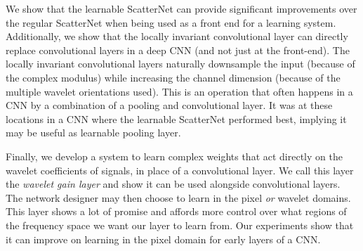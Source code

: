 \documentclass{article}
\begin{document}
  We show that the learnable ScatterNet can provide significant improvements
  over the regular ScatterNet when being used as a front end for a learning
  system. Additionally, we show that the locally invariant convolutional
  layer can directly replace convolutional layers in a deep CNN (and not just at the front-end).
  The locally invariant convolutional layers naturally downsample the input
  (because of the complex modulus) while increasing the channel dimension (because of the multiple
  wavelet orientations used). This is an operation that often happens in a CNN
  by a combination of a pooling and convolutional layer. It was at these
  locations in a CNN where the learnable ScatterNet performed best, implying it
  may be useful as learnable pooling layer.

  Finally, we develop a system to learn complex weights that act directly on the
  wavelet coefficients of signals, in place of a convolutional layer. We call
  this layer the \emph{wavelet gain layer} and show it can be used alongside convolutional
  layers. The network designer may then choose to learn in the pixel \emph{or}
  wavelet domains. This layer shows a lot of promise and affords more control over what
  regions of the frequency space we want our layer to learn from. Our
  experiments show that it can improve on learning in the pixel domain for early
  layers of a CNN.
\end{document}
